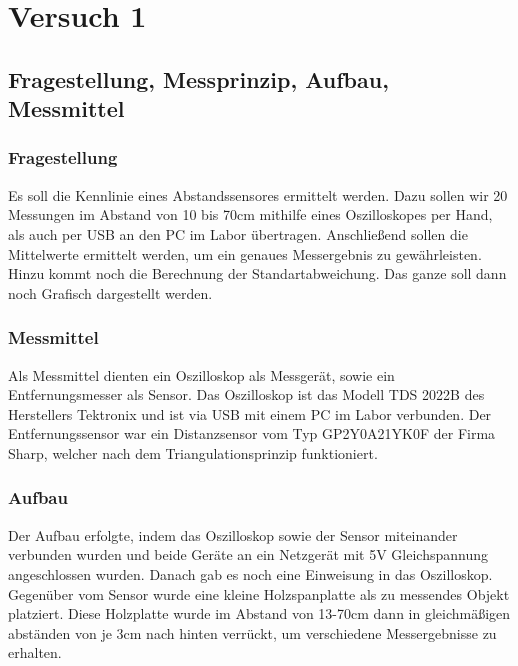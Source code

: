 \documentclass[TGAI_Laborbericht.tex]{subfiles}
\begin{document}
\chapter{Versuch 1}
\label{chap:VERSUCH_1}


\section{Fragestellung, Messprinzip, Aufbau, Messmittel}
\label{chap:VERSUCH_1_FRAGESTELLUNG}

\subsection*{Fragestellung}
Es soll die Kennlinie eines Abstandssensores ermittelt werden. Dazu sollen wir 20 Messungen im Abstand von 10 bis 70cm mithilfe eines Oszilloskopes per Hand, als auch per USB an den PC im Labor übertragen. Anschließend sollen die Mittelwerte ermittelt werden, um ein genaues Messergebnis zu gewährleisten. Hinzu kommt noch die Berechnung der Standartabweichung. Das ganze soll dann noch Grafisch dargestellt werden.

\subsection*{Messmittel}
\begin{flushleft}
Als Messmittel dienten ein Oszilloskop als Messgerät, sowie ein Entfernungsmesser als
Sensor. Das Oszilloskop ist das Modell TDS 2022B des Herstellers Tektronix und ist via USB mit einem PC im Labor verbunden. Der Entfernungssensor war ein Distanzsensor vom Typ GP2Y0A21YK0F der
Firma Sharp, welcher nach dem Triangulationsprinzip funktioniert.
\end{flushleft}

\subsection*{Aufbau}
\begin{flushleft}
Der Aufbau erfolgte, indem das Oszilloskop sowie der Sensor miteinander verbunden wurden und beide Geräte an ein Netzgerät mit 5V Gleichspannung angeschlossen wurden.
Danach gab es noch eine Einweisung in das Oszilloskop. Gegenüber vom Sensor wurde eine kleine Holzspanplatte als zu messendes Objekt platziert. Diese Holzplatte wurde im Abstand von 13-70cm dann in gleichmäßigen abständen von je 3cm nach hinten verrückt, um verschiedene Messergebnisse zu erhalten.
\end{flushleft}
\end{document}
